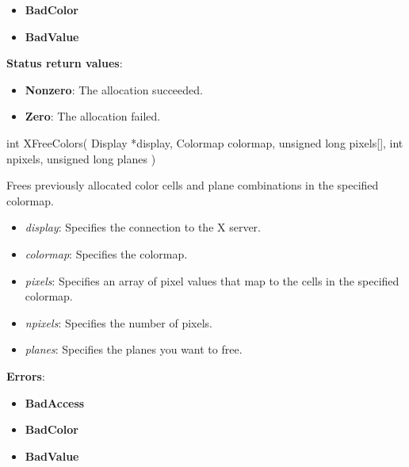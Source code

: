 \documentclass{report}
\begin{document}
\begin{itemize}
            \begin{itemize}
                \item \textbf{BadColor}
                \item \textbf{BadValue}
            \end{itemize}
            \bigbreak \noindent
            \textbf{Status return values}:
            \begin{itemize}
                \item \textbf{Nonzero}: The allocation succeeded.
                \item \textbf{Zero}: The allocation failed.
            \end{itemize}

            \begin{cppcode}
                int XFreeColors(
                    Display *display,
                    Colormap colormap,
                    unsigned long pixels[],
                    int npixels,
                    unsigned long planes
                )
            \end{cppcode}
            \bigbreak \noindent
            Frees previously allocated color cells and plane combinations in the specified colormap.
            \begin{itemize}
                \item \textit{display}: Specifies the connection to the X server.
                \item \textit{colormap}: Specifies the colormap.
                \item \textit{pixels}: Specifies an array of pixel values that map to the cells in the specified colormap.
                \item \textit{npixels}: Specifies the number of pixels.
                \item \textit{planes}: Specifies the planes you want to free.
            \end{itemize}
            \bigbreak \noindent
            \textbf{Errors}:
            \begin{itemize}
                \item \textbf{BadAccess}
                \item \textbf{BadColor}
                \item \textbf{BadValue}
            \end{itemize}


\end{itemize}
\end{document}
